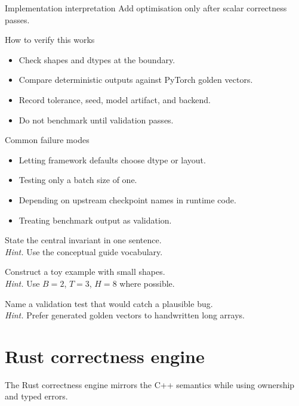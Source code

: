 \begin{implementationbox}{Implementation interpretation}
Add optimisation only after scalar correctness passes.
\end{implementationbox}

\begin{verificationbox}{How to verify this works}
\begin{itemize}
\item Check shapes and dtypes at the boundary.
\item Compare deterministic outputs against PyTorch golden vectors.
\item Record tolerance, seed, model artifact, and backend.
\item Do not benchmark until validation passes.
\end{itemize}
\end{verificationbox}

\begin{warningbox}{Common failure modes}
\begin{itemize}
\item Letting framework defaults choose dtype or layout.
\item Testing only a batch size of one.
\item Depending on upstream checkpoint names in runtime code.
\item Treating benchmark output as validation.
\end{itemize}
\end{warningbox}

\begin{chapterexercises}
\item State the central invariant in one sentence.\\
\textit{Hint.} Use the conceptual guide vocabulary.
\item Construct a toy example with small shapes.\\
\textit{Hint.} Use $B=2$, $T=3$, $H=8$ where possible.
\item Name a validation test that would catch a plausible bug.\\
\textit{Hint.} Prefer generated golden vectors to handwritten long arrays.
\end{chapterexercises}

\chapter{Rust correctness engine}
\label{ch:rust-engine}
The Rust correctness engine mirrors the C++ semantics while using ownership and typed errors. \citep{rustBook,rust2024edition}

